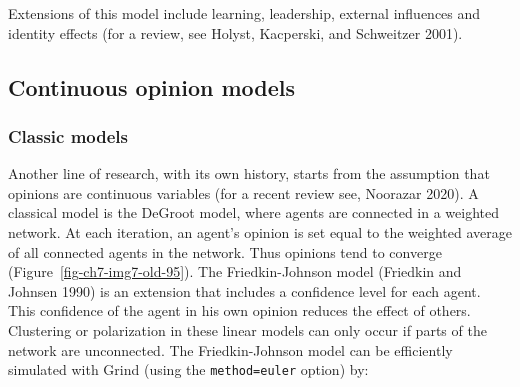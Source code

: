 \documentclass[
  a4paper,
  DIV=11,
  numbers=noendperiod,
  oneside]{scrreprt}
\begin{document}
Extensions of this model include learning, leadership, external
influences and identity effects (for a review, see Holyst, Kacperski,
and Schweitzer 2001).

\hypertarget{sec-Continuous-opinion-models}{%
\subsection{Continuous opinion
models}\label{sec-Continuous-opinion-models}}

\hypertarget{sec-Classic-models}{%
\subsubsection{Classic models}\label{sec-Classic-models}}

Another line of research, with its own history, starts from the
assumption that opinions are continuous variables (for a recent review
see, Noorazar 2020). A classical model is the DeGroot model, where
agents are connected in a weighted network. At each iteration, an
agent's opinion is set equal to the weighted average of all connected
agents in the network. Thus opinions tend to converge
(Figure~\ref{fig-ch7-img7-old-95}). The Friedkin-Johnson model (Friedkin
and Johnsen 1990) is an extension that includes a confidence level for
each agent. This confidence of the agent in his own opinion reduces the
effect of others. Clustering or polarization in these linear models can
only occur if parts of the network are unconnected. The Friedkin-Johnson
model can be efficiently simulated with Grind (using the
\texttt{method=\textquotesingle{}euler\textquotesingle{}} option) by:
\end{document}
